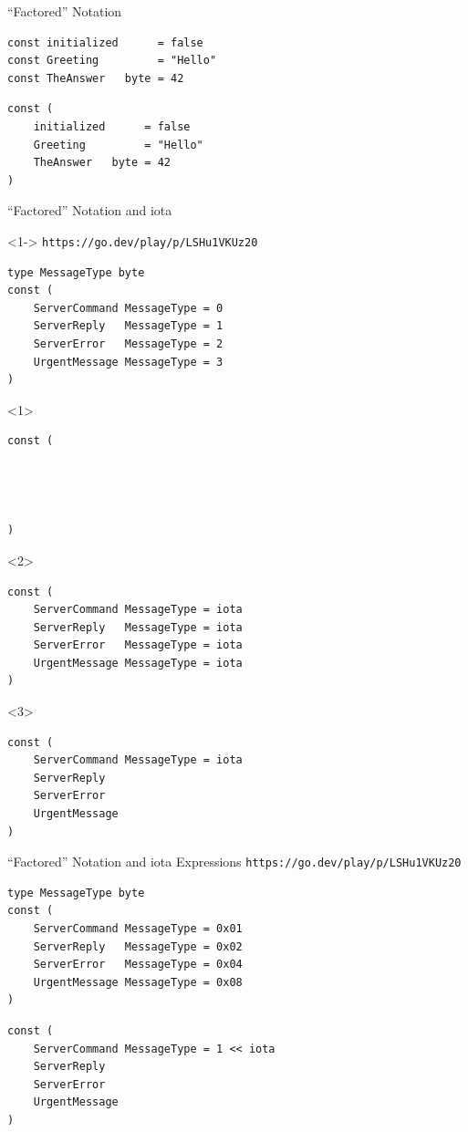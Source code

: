 \documentclass[pdf]{beamer}
\newcommand\z[1]{\texttt{#1}}
\newcommand\playground[1]{{\color{gray}\z{#1}}}
\begin{document}
\begin{frame}[fragile]{``Factored'' Notation}
\begin{lstlisting}
const initialized      = false
const Greeting         = "Hello"
const TheAnswer   byte = 42
\end{lstlisting}
\begin{lstlisting}
const (
    initialized      = false
    Greeting         = "Hello"
    TheAnswer   byte = 42
)
\end{lstlisting}
\end{frame}

\begin{frame}[fragile]{``Factored'' Notation and iota}
\begin{onlyenv}<1->
\playground{https://go.dev/play/p/LSHu1VKUz20}
\begin{lstlisting}
type MessageType byte
const (
    ServerCommand MessageType = 0
    ServerReply   MessageType = 1
    ServerError   MessageType = 2
    UrgentMessage MessageType = 3
)
\end{lstlisting}
\end{onlyenv}
\begin{onlyenv}<1>
\begin{lstlisting}
const (




)
\end{lstlisting}
\end{onlyenv}
\begin{onlyenv}<2>
\begin{lstlisting}
const (
    ServerCommand MessageType = iota
    ServerReply   MessageType = iota
    ServerError   MessageType = iota
    UrgentMessage MessageType = iota
)
\end{lstlisting}
\end{onlyenv}
\begin{onlyenv}<3>
\begin{lstlisting}
const (
    ServerCommand MessageType = iota
    ServerReply   
    ServerError   
    UrgentMessage 
)
\end{lstlisting}
\end{onlyenv}
\end{frame}
\begin{frame}[fragile]{``Factored'' Notation and iota Expressions}
\playground{https://go.dev/play/p/LSHu1VKUz20}
\begin{lstlisting}
type MessageType byte
const (
    ServerCommand MessageType = 0x01
    ServerReply   MessageType = 0x02
    ServerError   MessageType = 0x04
    UrgentMessage MessageType = 0x08
)
\end{lstlisting}
\begin{lstlisting}
const (
    ServerCommand MessageType = 1 << iota
    ServerReply   
    ServerError   
    UrgentMessage 
)
\end{lstlisting}
\end{frame}
\end{document}
